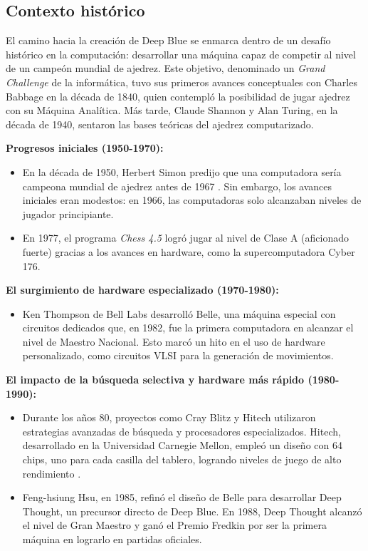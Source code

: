 \documentclass[12pt,a4paper]{article}
\begin{document}
\subsection{Contexto histórico}

El camino hacia la creación de Deep Blue se enmarca dentro de un desafío histórico en la computación: desarrollar una máquina capaz de competir al nivel de un campeón mundial de ajedrez. Este objetivo, denominado un \textit{Grand Challenge} de la informática, tuvo sus primeros avances conceptuales con Charles Babbage en la década de 1840, quien contempló la posibilidad de jugar ajedrez con su Máquina Analítica. Más tarde, Claude Shannon \cite{Shannon01031950} y Alan Turing, en la década de 1940, sentaron las bases teóricas del ajedrez computarizado.

\textbf{Progresos iniciales (1950-1970):}  
\begin{itemize}
    \item En la década de 1950, Herbert Simon predijo que una computadora sería campeona mundial de ajedrez antes de 1967 \cite{simonherbertspeech}. Sin embargo, los avances iniciales eran modestos: en 1966, las computadoras solo alcanzaban niveles de jugador principiante.
    \item En 1977, el programa \textit{Chess 4.5} \cite{slate1977chess} logró jugar al nivel de Clase A (aficionado fuerte) gracias a los avances en hardware, como la supercomputadora Cyber 176.
\end{itemize}

\textbf{El surgimiento de hardware especializado (1970-1980):}  
\begin{itemize}
    \item Ken Thompson \cite{condon1982belle} de Bell Labs desarrolló Belle, una máquina especial con circuitos dedicados que, en 1982, fue la primera computadora en alcanzar el nivel de Maestro Nacional. Esto marcó un hito en el uso de hardware personalizado, como circuitos VLSI para la generación de movimientos.
\end{itemize}

\textbf{El impacto de la búsqueda selectiva y hardware más rápido (1980-1990):}  
\begin{itemize}
    \item Durante los años 80, proyectos como Cray Blitz \cite{hyatt1985parallel} y Hitech utilizaron estrategias avanzadas de búsqueda y procesadores especializados. Hitech, desarrollado en la Universidad Carnegie Mellon, empleó un diseño con 64 chips, uno para cada casilla del tablero, logrando niveles de juego de alto rendimiento \cite{ebeling1987all}.
    \item Feng-hsiung Hsu, en 1985, refinó el diseño de Belle para desarrollar Deep Thought, un precursor directo de Deep Blue\cite{hsu1990deep, hsu1987two, hsu1989chess}. En 1988, Deep Thought alcanzó el nivel de Gran Maestro y ganó el Premio Fredkin por ser la primera máquina en lograrlo en partidas oficiales.
\end{itemize}
\end{document}
